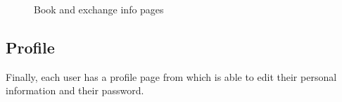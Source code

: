 \begin{figure}[H]
{      }
      \caption{Book and exchange info pages}
\end{figure}

\subsection{Profile}
Finally, each user has a profile page from which is able to edit their personal information and their password.

